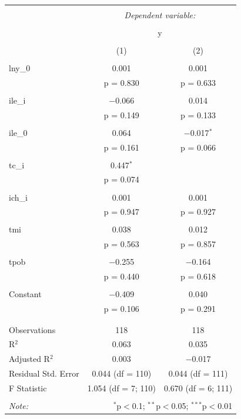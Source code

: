 \begin{table}[!htbp] \centering 
    \tiny
  \caption{} 
  \label{} 
\begin{tabular}{@{\extracolsep{5pt}}lcc} 
\\[-1.8ex]\hline 
\hline \\[-1.8ex] 
 & \multicolumn{2}{c}{\textit{Dependent variable:}} \\ 
\cline{2-3} 
\\[-1.8ex] & \multicolumn{2}{c}{y} \\ 
\\[-1.8ex] & (1) & (2)\\ 
\hline \\[-1.8ex] 
 lny\_0 & 0.001 & 0.001 \\ 
  & p = 0.830 & p = 0.633 \\ 
  & & \\ 
 ile\_i & $-$0.066 & 0.014 \\ 
  & p = 0.149 & p = 0.133 \\ 
  & & \\ 
 ile\_0 & 0.064 & $-$0.017$^{*}$ \\ 
  & p = 0.161 & p = 0.066 \\ 
  & & \\ 
 tc\_i & 0.447$^{*}$ &  \\ 
  & p = 0.074 &  \\ 
  & & \\ 
 ich\_i & 0.001 & 0.001 \\ 
  & p = 0.947 & p = 0.927 \\ 
  & & \\ 
 tmi & 0.038 & 0.012 \\ 
  & p = 0.563 & p = 0.857 \\ 
  & & \\ 
 tpob & $-$0.255 & $-$0.164 \\ 
  & p = 0.440 & p = 0.618 \\ 
  & & \\ 
 Constant & $-$0.409 & 0.040 \\ 
  & p = 0.106 & p = 0.291 \\ 
  & & \\ 
\hline \\[-1.8ex] 
Observations & 118 & 118 \\ 
R$^{2}$ & 0.063 & 0.035 \\ 
Adjusted R$^{2}$ & 0.003 & $-$0.017 \\ 
Residual Std. Error & 0.044 (df = 110) & 0.044 (df = 111) \\ 
F Statistic & 1.054 (df = 7; 110) & 0.670 (df = 6; 111) \\ 
\hline 
\hline \\[-1.8ex] 
\textit{Note:}  & \multicolumn{2}{r}{$^{*}$p$<$0.1; $^{**}$p$<$0.05; $^{***}$p$<$0.01} \\ 
\end{tabular} 
\end{table}


